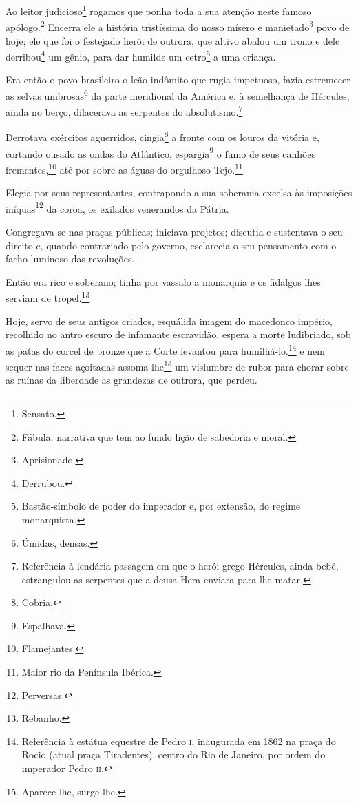 \asterisc{}

Ao leitor judicioso\footnote{Sensato.} rogamos que ponha toda a sua
atenção neste famoso apólogo.\footnote{Fábula, narrativa que tem ao
  fundo lição de sabedoria e moral.} Encerra ele a história tristíssima
do nosso mísero e manietado\footnote{Aprisionado.} povo de hoje; ele
que foi o festejado herói de outrora, que altivo abalou um trono e dele
derribou\footnote{Derrubou.} um gênio, para dar humilde um
cetro\footnote{Bastão-símbolo de poder do imperador e, por extensão,
  do regime monarquista.} a uma criança.

Era então o povo brasileiro o leão indômito que rugia impetuoso, fazia
estremecer as selvas umbrosas\footnote{Úmidas, densas.} da parte
meridional da América e, à semelhança de Hércules, ainda no berço,
dilacerava as serpentes do absolutismo.\footnote{Referência à lendária passagem
   em que o herói grego Hércules, ainda bebê, estrangulou as
  serpentes que a deusa Hera enviara para lhe matar.}

Derrotava exércitos aguerridos, cingia\footnote{Cobria.} a fronte com
os louros da vitória e, cortando ousado as ondas do Atlântico,
espargia\footnote{Espalhava.} o fumo de seus canhões
frementes,\footnote{Flamejantes.} até por sobre as águas do orgulhoso
Tejo.\footnote{Maior rio da Península Ibérica.}

Elegia por seus representantes, contrapondo a sua soberania excelsa às
imposições iníquas\footnote{Perversas.} da coroa, os exilados
venerandos da Pátria.

Congregava-se nas praças públicas; iniciava projetos; discutia e
sustentava o seu direito e, quando contrariado pelo governo, esclarecia
o seu pensamento com o facho luminoso das revoluções.

Então era rico e soberano; tinha por vassalo a monarquia e os fidalgos
lhes serviam de tropel.\footnote{Rebanho.}

Hoje, servo de seus antigos criados, esquálida imagem do macedonco
império, recolhido no antro escuro de infamante escravidão, espera a
morte ludibriado, sob as patas do corcel de bronze que a Corte levantou
para humilhá-lo.\footnote{Referência à estátua equestre de Pedro \textsc{i},
  inaugurada em 1862 na praça do Rocio (atual praça Tiradentes), centro
  do Rio de Janeiro, por ordem do imperador Pedro \textsc{ii}.} e nem sequer nas
faces açoitadas assoma-lhe\footnote{Aparece-lhe, surge-lhe.} um
vislumbre de rubor para chorar sobre as ruínas da liberdade as grandezas
de outrora, que perdeu.


